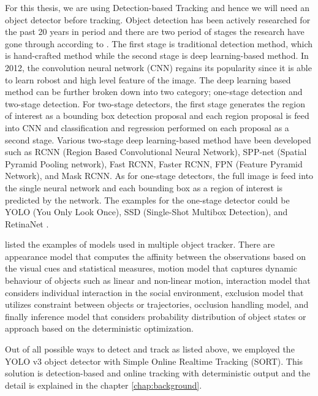 For this thesis, we are using Detection-based Tracking and hence we will need an object detector before tracking. Object detection has been actively researched for the past 20 years in period and there are two period of stages the research have gone through according to \citeauthor{zou_object_2019} \cite{zou_object_2019}. The first stage is traditional detection method, which is hand-crafted method while the second stage is deep learning-based method. In 2012, the convolution neural network (CNN) regains its popularity since it is able to learn robost and high level feature of the image. The deep learning based method can be further broken down into two category; one-stage detection and two-stage detection. For two-stage detectors, the first stage generates the region of interest as a bounding box detection proposal and each region proposal is feed into CNN and classification and regression performed on each proposal as a second stage. Various two-stage deep learning-based method have been developed such as RCNN (Region Based Convolutional Neural Network), SPP-net (Spatial Pyramid Pooling network), Fast RCNN, Faster RCNN, FPN (Feature Pyramid Network), and Mask RCNN. As for one-stage detectors, the full image is feed into the single neural network and each bounding box as a region of interest is predicted by the network. The examples for the one-stage detector could be YOLO (You Only Look Once), SSD (Single-Shot Multibox Detection), and RetinaNet \cite{zou_object_2019} \cite{sultana_review_2020}.

\citeauthor{luo_multiple_2021} listed the examples of models used in multiple object tracker. There are appearance model that computes the affinity between the observations based on the visual cues and statistical measures, motion model that captures dynamic behaviour of objects such as linear and non-linear motion, interaction model that considers individual interaction in the social environment, exclusion model that utilizes constraint between objects or trajectories, occlusion handling model, and finally inference model that considers probability distribution of object states or approach based on the deterministic optimization.

Out of all possible ways to detect and track as listed above, we employed the YOLO v3 object detector with Simple Online Realtime Tracking (SORT). This solution is detection-based and online tracking with deterministic output and the detail is explained in the chapter \ref{chap:background}.

